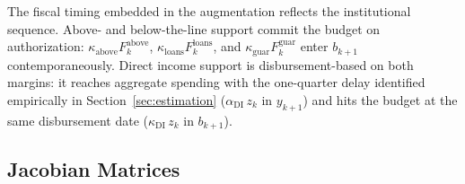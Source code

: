 \documentclass[12pt, a4paper]{article}
\begin{document}
The fiscal timing embedded in the augmentation reflects the institutional
sequence. Above- and below-the-line support commit the budget on authorization:
$\kappa_{\text{above}} F^{\text{above}}_k$, $\kappa_{\text{loans}}
F^{\text{loans}}_k$, and $\kappa_{\text{guar}} F^{\text{guar}}_k$ enter
$b_{k+1}$ contemporaneously. Direct income support is disbursement-based on both
margins: it reaches aggregate spending with the one-quarter delay identified
empirically in Section~\ref{sec:estimation}
($\alpha_{\text{DI}}\, z_k$ in $y_{k+1}$) and hits the budget at the same
disbursement date ($\kappa_{\text{DI}}\, z_k$ in $b_{k+1}$).

\subsection{Jacobian Matrices}
\label{app:jacobians}
\end{document}
